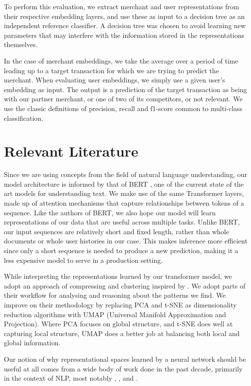 \documentclass{article}
\begin{document}
To perform this evaluation, we extract merchant and user representations from their respective embedding layers, and use these as input to a decision tree  as an independent reference classifier. A decision tree was chosen to avoid learning new parameters that may interfere with the information stored in the representations themselves. 

In the case of merchant embeddings, we take the average over a period of time leading up to a target transaction for which we are trying to predict the merchant. When evaluating user embeddings, we simply use a given user's embedding as input. The output is a prediction of the target transaction as being with our partner merchant, or one of two of its competitors, or not relevant. We use the classic definitions of precision, recall and f1-score common to multi-class classification.

\section{Relevant Literature}
Since we are using concepts from the field of natural language understanding, our model architecture is informed by that of BERT \cite{Devlin:2018}, one of the current state of the art models for understanding text. We make use of the same Transformer layers, made up of attention mechanisms \cite{Vaswani:2017} that capture relationships between tokens of a sequence. Like the authors of BERT, we also hope our model will learn representations of our data that are useful across multiple tasks. Unlike BERT, our input sequences are relatively short and fixed length, rather than whole documents or whole user histories in our case. This makes inference more efficient since only a short sequence is needed to produce a new prediction, making it a less expensive model to serve in a production setting.

While interpreting the representations learned by our transformer model, we adopt an approach of compressing and clustering inspired by \cite{Liu2019LatentSC}. We adopt parts of their workflow for analysing and reasoning about the patterns we find. We improve on their methodology by replacing PCA and t-SNE as dimensionality reduction algorithms with UMAP \cite{McInnes:2018} (Universal Manifold Approximation and Projection). Where PCA focuses on global structure, and t-SNE does well at capturing local structure, UMAP does a better job at balancing both local and global information.

Our notion of why representational spaces learned by a neural network should be useful at all comes from a wide body of work done in the past decade, primarily in the context of NLP, most notably \cite{Fefferman:2013}, \cite{Bengio:2012}, and \cite{Pennington:2014}.
\end{document}

